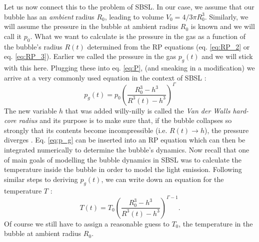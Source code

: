 \documentclass[rmp,aps,nofootinbib,superscriptaddress,floatfix]{revtex4-2}
\begin{document}
Let us now connect this to the problem of SBSL. In our case, we assume that our bubble has an \emph{ambient} radius $R_0$, leading to volume $V_0 =  4/3 \pi R_0^3$. Similarly, we will assume the pressure in the bubble at ambient radius $R_0$ is known and we will call it $p_0$. What we want to calculate is the pressure in the gas as a function of the bubble's radius $R(t)$ determined from the RP equations (eq. \ref{eq:RP_2} or eq. \ref{eq:RP_3}). Earlier we called the pressure in the gas $p_g(t)$ and we will stick with this here. Plugging these into eq. \ref{eq:P}, (and sneaking in a modification) we arrive at a very commonly used equation in the context of SBSL \cite{brenner2002single,lofstedt1995sonoluminescing,barber1997defining,lofstedt1993toward,hilgenfeldt1999simple}:
\begin{equation}
    p_g(t) = p_0 \left( \frac{R_0^3-h^3}{R^3(t)-h^3} \right)^ \Gamma
    \label{eq:p_g}
\end{equation}
The new variable $h$ that was added willy-nilly is called the \emph{Van der Walls hard-core radius} and its purpose is to make sure that, if the bubble collapses so strongly that its contents become incompressible (i.e. $R(t)\rightarrow h$), the pressure diverges \cite{lofstedt1993toward,brenner2002single}. Eq. \ref{eq:p_g} can be inserted into an RP equation which can then be integrated numerically to determine the bubble's dynamics. Now recall that one of main goals of modelling the bubble dynamics in SBSL was to calculate the temperature inside the bubble in order to model the light emission. Following similar steps to deriving $p_g(t)$, we can write down an equation for the temperature $T$ \cite{barber1997defining,brenner2002single}:
\begin{equation}
    T(t) = T_0 \left( \frac{R_0^3-h^3}{R^3(t)-h^3} \right)^ {\Gamma-1}.
    \label{eq:T(t)}
\end{equation}
Of course we still have to assign a reasonable guess to $T_0$, the temperature in the bubble at ambient radius $R_0$.
\end{document}
